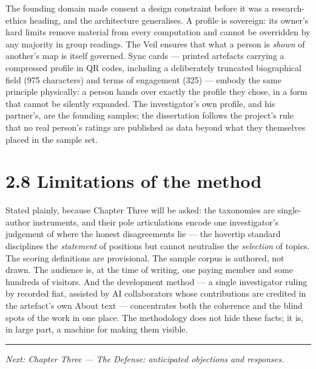 The founding domain made consent a design constraint before it was a
research-ethics heading, and the architecture generalises. A profile is
sovereign: its owner's hard limits remove material from every
computation and cannot be overridden by any majority in group readings.
The Veil ensures that what a person is \emph{shown} of another's map is
itself governed. Sync cards --- printed artefacts carrying a compressed
profile in QR codes, including a deliberately truncated biographical
field (975 characters) and terms of engagement (325) --- embody the same
principle physically: a person hands over exactly the profile they
chose, in a form that cannot be silently expanded. The investigator's
own profile, and his partner's, are the founding samples; the
dissertation follows the project's rule that no real person's ratings
are published as data beyond what they themselves placed in the sample
set.

\section{2.8 Limitations of the method}\label{limitations-of-the-method}

Stated plainly, because Chapter Three will be asked: the taxonomies are
single-author instruments, and their pole articulations encode one
investigator's judgement of where the honest disagreements lie --- the
hovertip standard disciplines the \emph{statement} of positions but
cannot neutralise the \emph{selection} of topics. The scoring
definitions are provisional. The sample corpus is authored, not drawn.
The audience is, at the time of writing, one paying member and some
hundreds of visitors. And the development method --- a single
investigator ruling by recorded fiat, assisted by AI collaborators whose
contributions are credited in the artefact's own About text ---
concentrates both the coherence and the blind spots of the work in one
place. The methodology does not hide these facts; it is, in large part,
a machine for making them visible.

\begin{center}\rule{0.5\linewidth}{0.5pt}\end{center}

\emph{Next: Chapter Three --- The Defense: anticipated objections and
responses.}
